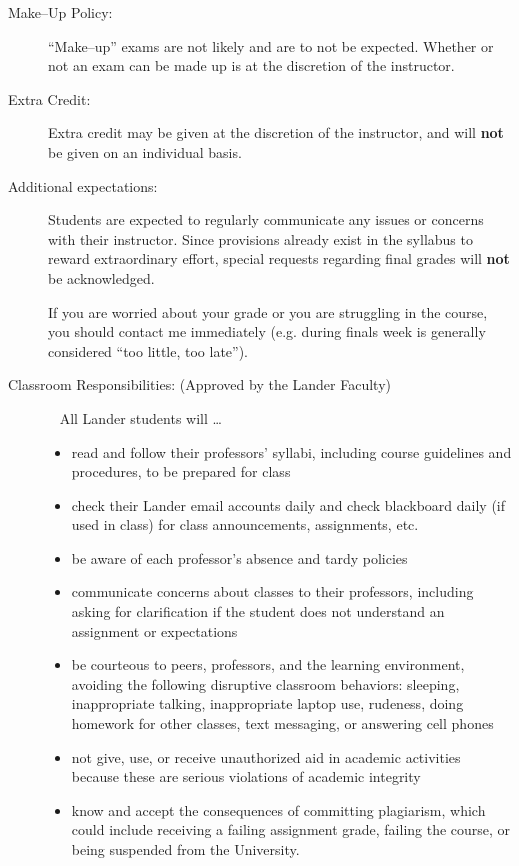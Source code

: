 \documentclass{article}
\begin{document}
  \begin{description}
\item[Make--Up Policy:] ``Make--up'' exams are not likely and are to not be expected. Whether or not an exam can be made up is at the discretion of the instructor.

\item[Extra Credit:] Extra credit may be given at the discretion of the instructor, and will \textbf{not} be given on an individual basis.

\item[Additional expectations:]
  Students are expected to regularly communicate any issues or concerns with their instructor. Since provisions already exist in the syllabus to reward extraordinary effort, special requests regarding final grades will \textbf{not} be acknowledged.

  If you are worried about your grade or you are struggling in the course, you should contact me immediately (e.g. during finals week is generally considered ``too little, too late'').

\item[Classroom Responsibilities: (Approved by the Lander Faculty)]\ \newline
  All Lander students will \dots
  \begin{itemize}
    \item read and follow their professors' syllabi, including course guidelines and procedures, to be prepared for class
    \item check their Lander email accounts daily and check blackboard daily (if used in class) for class announcements, assignments, etc.
    \item be aware of each professor’s absence and tardy policies
    \item communicate concerns about classes to their professors, including asking for clarification if the student does not understand an assignment or expectations
    \item be courteous to peers, professors, and the learning environment, avoiding the following disruptive classroom behaviors: sleeping, inappropriate talking, inappropriate laptop use, rudeness, doing homework for other classes, text messaging, or answering cell phones
    \item not give, use, or receive unauthorized aid in academic activities because these are serious violations of academic integrity
    \item know and accept the consequences of committing plagiarism, which could include receiving a failing assignment grade, failing the course, or being suspended from the University.
  \end{itemize}


\end{description}
\end{document}

